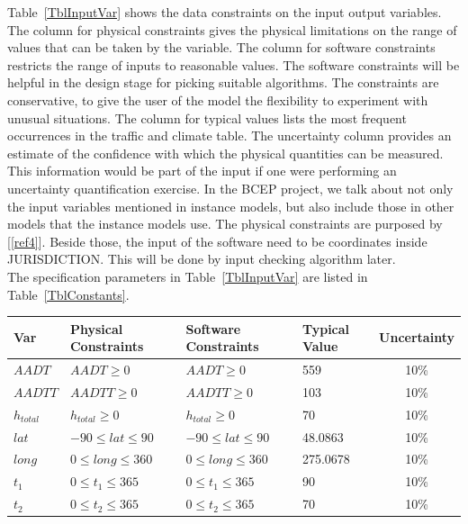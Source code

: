 \documentclass[12pt]{article}
\newcommand{\reref}[1]{\ref{#1}}
\begin{document}
Table~\ref{TblInputVar} shows the data constraints on the input output
variables. The column for physical constraints gives the physical limitations
on the range of values that can be taken by the variable. The column for
software constraints restricts the range of inputs to reasonable values. The software constraints will be helpful in the design stage for picking suitable
algorithms.  The constraints are conservative, to give the user of the model the
flexibility to experiment with unusual situations. The column for typical values lists the most frequent occurrences in the traffic and climate table. The uncertainty column provides an estimate of the confidence with which the physical quantities can be measured. This information would be part of the input if one were performing an uncertainty quantification exercise. In the BCEP project, we talk about not only the input variables mentioned in instance models, but also include those in other models that the instance models use. The physical constraints are purposed by [\reref{ref4}]. Beside those, the input of the software need to be coordinates inside JURISDICTION. This will be done by input checking algorithm later. \\
The specification parameters in Table~\ref{TblInputVar} are listed in
Table~\ref{TblConstants}.

\begin{table}[!h]
  \caption{Input Variables} \label{TblInputVar}
  \renewcommand{\arraystretch}{1.2}
\noindent \begin{longtable*}{l l l l c} 
  \toprule
  \textbf{Var} & \textbf{Physical Constraints} & \textbf{Software Constraints} &
                             \textbf{Typical Value} & \textbf{Uncertainty}\\
  \midrule 
  $AADT$ & $AADT \ge 0$ & $AADT \ge 0$ & 559 & 10\%  \\
  $AADTT$ & $AADTT \ge 0$ & $AADTT \ge 0$ & 103  & 10\%
  \\
  $h_{total}$ & $h_{total} \ge 0$ & $h_{total} \ge 0$ &  70  & 10\%
  \\
  $lat$ & $-90 \leq lat \leq 90$ & $-90 \leq lat \leq 90$ & 48.0863 & 10\%
  \\
  $long$ & $0 \leq long \leq 360$ & $0 \leq long \leq 360$ &  275.0678 & 10\%
  \\
  $t_1$ & $0 \leq t_1 \leq 365$ & $0 \leq t_1 \leq 365$ &  90  & 10\%
  \\
  $t_2$ & $0 \leq t_2 \leq 365$ & $0 \leq t_2 \leq 365$ &  70  & 10\%
  \\
  \bottomrule
\end{longtable*}
\end{table}
\end{document}
